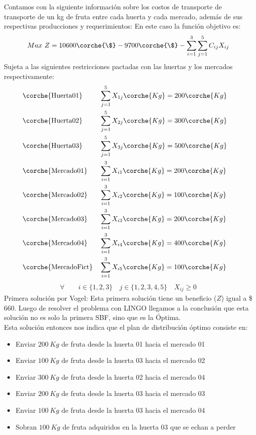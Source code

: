
\begin{homeworkProblem}
Contamos con la siguiente información sobre los costos de transporte de transporte de un kg de fruta entre cada huerta y cada mercado, además de sus respectivas producciones y requerimientos:
En este caso la función objetivo es:
\begin{align*}
    Max\ Z = 10600\corche{\$} - 9700\corche{\$} - \sum_{i=1}^{3}{\sum_{j=1}^{5}{C_{ij}X_{ij}}}
\end{align*}
Sujeta a las siguientes restricciones pactadas con las huertas y los mercados respectivamente:
\begin{align*}
    &\corche{\text{Huerta01}}& &\sum_{j=1}^{5}{X_{1j}}\corche{Kg} = 200\corche{Kg}&\\ 
    &\corche{\text{Huerta02}}& &\sum_{j=1}^{5}{X_{2j}}\corche{Kg} = 300\corche{Kg}&\\ 
    &\corche{\text{Huerta03}}& &\sum_{j=1}^{5}{X_{3j}}\corche{Kg} = 500\corche{Kg}&\\ 
    &\corche{\text{Mercado01}}& &\sum_{i=1}^{3}{X_{i1}}\corche{Kg} = 200\corche{Kg}&\\ 
    &\corche{\text{Mercado02}}& &\sum_{i=1}^{3}{X_{i2}}\corche{Kg} = 100\corche{Kg}&\\ 
    &\corche{\text{Mercado03}}& &\sum_{i=1}^{3}{X_{i3}}\corche{Kg} = 200\corche{Kg}&\\ 
    &\corche{\text{Mercado04}}& &\sum_{i=1}^{3}{X_{i4}}\corche{Kg} = 400\corche{Kg}&\\ 
    &\corche{\text{MercadoFict}}& &\sum_{i=1}^{3}{X_{i5}}\corche{Kg} = 100\corche{Kg}&\\ 
\end{align*}
\begin{align*}
     \forall\quad\quad i \in \{1,2,3\}\quad j \in \{1,2,3,4,5\}\quad X_{ij} \ge 0
\end{align*}
Primera solución por Vogel:
Esta primera solución tiene un beneficio ($Z$) igual a \$ 660. Luego de resolver el problema con LINGO llegamos a la conclusión que esta solución no es solo la primera SBF, sino que es la Óptima. \\
Esta solución entonces nos indica que el plan de distribución óptimo consiste en:
\begin{itemize}
    \item Enviar $200\ Kg$ de fruta desde la huerta 01 hacia el mercado 01 
    \item Enviar $100\ Kg$ de fruta desde la huerta 03 hacia el mercado 02 
    \item Enviar $300\ Kg$ de fruta desde la huerta 02 hacia el mercado 04 
    \item Enviar $200\ Kg$ de fruta desde la huerta 03 hacia el mercado 03 
    \item Enviar $100\ Kg$ de fruta desde la huerta 03 hacia el mercado 04
    \item Sobran $100\ Kg$ de fruta adquiridos en la huerta 03 que se echan a perder 
\end{itemize}

\end{homeworkProblem}

 
